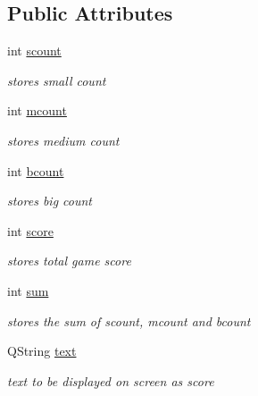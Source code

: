 \subsection*{Public Attributes}
\begin{DoxyCompactItemize}
\item 
\mbox{\label{classgame1score_a5cdaac95a04c8036bf56c01f8fa3099e}} 
int \hyperlink{classgame1score_a5cdaac95a04c8036bf56c01f8fa3099e}{scount}
\begin{DoxyCompactList}\small\item\em stores small count \end{DoxyCompactList}\item 
\mbox{\label{classgame1score_ab4ad7f19068b4719593cc7b4ee7dbd06}} 
int \hyperlink{classgame1score_ab4ad7f19068b4719593cc7b4ee7dbd06}{mcount}
\begin{DoxyCompactList}\small\item\em stores medium count \end{DoxyCompactList}\item 
\mbox{\label{classgame1score_a1396fb2d6d045ca1726b9b34e130ec8f}} 
int \hyperlink{classgame1score_a1396fb2d6d045ca1726b9b34e130ec8f}{bcount}
\begin{DoxyCompactList}\small\item\em stores big count \end{DoxyCompactList}\item 
\mbox{\label{classgame1score_af8f924e5fbe567b2583583d2d95550d7}} 
int \hyperlink{classgame1score_af8f924e5fbe567b2583583d2d95550d7}{score}
\begin{DoxyCompactList}\small\item\em stores total game score \end{DoxyCompactList}\item 
\mbox{\label{classgame1score_a2fdce0ba179a04bfbbd5f296040bb2f7}} 
int \hyperlink{classgame1score_a2fdce0ba179a04bfbbd5f296040bb2f7}{sum}
\begin{DoxyCompactList}\small\item\em stores the sum of scount, mcount and bcount \end{DoxyCompactList}\item 
\mbox{\label{classgame1score_aee8bbcda0471c31f20a0beea6d7c0c17}} 
Q\+String \hyperlink{classgame1score_aee8bbcda0471c31f20a0beea6d7c0c17}{text}
\begin{DoxyCompactList}\small\item\em text to be displayed on screen as score \end{DoxyCompactList}\end{DoxyCompactItemize}


